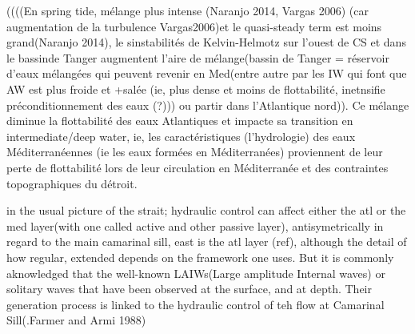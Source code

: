 ((((En spring tide, mélange plus intense (Naranjo 2014, Vargas 2006) (car augmentation de la turbulence Vargas2006)et le quasi-steady term est moins grand(Naranjo 2014), le sinstabilités de Kelvin-Helmotz sur l’ouest de CS et dans le bassinde Tanger augmentent l’aire de mélange(bassin de Tanger = réservoir d’eaux mélangées qui peuvent revenir en Med(entre autre par les IW qui font que AW est plus froide et +salée (ie, plus dense et moins de flottabilité, inetnsifie préconditionnement des eaux (?))) ou partir dans l’Atlantique nord)). Ce mélange diminue la flottabilité des eaux Atlantiques et impacte sa transition en intermediate/deep water, ie, les caractéristiques (l’hydrologie) des eaux Méditerranéennes (ie les eaux formées en Méditerranées) proviennent de leur perte de flottabilité lors de leur circulation en Méditerranée et des contraintes topographiques du détroit.











in the usual picture of the strait; hydraulic control can affect either the atl or the med layer(with one called active and other passive layer), antisymetrically in regard to the main camarinal sill, east is the atl layer (ref), although the detail of how regular, extended depends on the framework one uses. But it is commonly aknowledged that the well-known LAIWs(Large amplitude Internal waves) or solitary waves that have been observed at the surface, and at depth. Their generation process is linked to the hydraulic control of teh flow at Camarinal Sill(.Farmer and Armi 1988)


